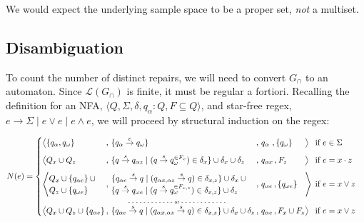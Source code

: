 \documentclass[sigplan,review,acmsmall,nonacm,screen,anonymous]{acmart}\settopmatter{printfolios=false,printccs=false,printacmref=false}
\begin{document}
\noindent We would expect the underlying sample space to be a proper set, \textit{not} a multiset.

\subsection{Disambiguation}\label{sec:transfer_method}

To count the number of distinct repairs, we will need to convert $G_\cap$ to an automaton. Since $\mathcal{L}(G_\cap)$ is finite, it must be regular a fortiori. Recalling the definition for an NFA, $\langle Q, \Sigma, \delta, q_\alpha: Q, F \subseteq Q \rangle$, and star-free regex, $e \rightarrow \Sigma \mid e \lor e \mid e \land e$, we will proceed by structural induction on the regex:

\begin{equation*}
N(e) =
\begin{cases}
  \begin{alignedat}{8}
    &\big\langle \{q_\alpha, q_\omega\}
    &&\,,\, \{ q_\alpha \overset{e}{\rightarrow} q_\omega \}
    &&\,,\, q_\alpha\,\,, \{q_{\omega}\}
    &&\big\rangle
    &&\:\: \text{if } e \in \Sigma \\[0.5em]

    &\big\langle Q_{x} \cup Q_{z}
    &&\,,\, \{ q \overset{s}{\rightarrow} q_{\alpha z} \mid (q \overset{s}{\rightarrow} q_{\omega}^{\in F_x}) \in \delta_x \} \cup \delta_{x} \cup \delta_{z}
    &&\,,\, q_{\alpha x}\,, F_{z}
    &&\big\rangle
    &&\:\: \text{if } e = x \cdot z \\[0.5em]

    &\Bigg\langle   \begin{matrix} Q_{x}\cup \{q_{\alpha e}\}\:\cup\\ Q_{z} \cup \{q_{\omega e}\}\phantom{\:\cup} \end{matrix}
    &&\,,\, \begin{matrix}\{ q_{\alpha e} \overset{s}{\rightarrow} q \mid (q_{\alpha x, \alpha z} \overset{s}{\rightarrow} q)\in \delta_{x, z} \} \cup \delta_{x}\:\cup\\
    \{ q \overset{s}{\rightarrow} q_{\omega e} \mid (q \overset{s}{\rightarrow} q_{\omega}^{\in F_{x,z}})\in \delta_{x, z} \}\cup \delta_{z}\phantom{\,\:\cup}\end{matrix}
    &&\,,\, q_{\alpha e}\,, \{q_{\omega e}\}
    &&\Bigg\rangle
    &&\:\:\text{if } e = x \lor z\hspace{-0.5cm}\\[-0.5em]
    \multicolumn{9}{c}{\tiny{\text{- - - - - - - - - - - - or - - - - - - - - - - - -}}} \\[-0.5em]
    &\big\langle Q_{x} \cup Q_{z} \cup \{q_{\alpha e}\}
    &&\,,\, \{ q_{\alpha e} \overset{s}{\rightarrow} q \mid (q_{\alpha x, \alpha z} \overset{s}{\rightarrow} q) \in \delta_{x, z} \}  \cup \delta_{x} \cup \delta_{z}
    &&\,,\, q_{\alpha e}\,, F_{x} \cup F_{z}
    &&\big\rangle
    &&\:\: \text{if } e = x \lor z
  \end{alignedat}
\end{cases}\vspace{0.2cm}
\end{equation*}
\end{document}
